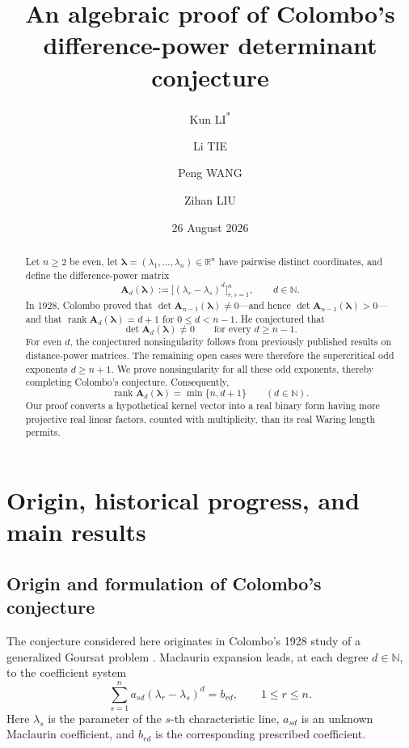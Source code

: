 \documentclass[11pt,letterpaper,reqno]{amsart}
\title[Colombo's difference-power determinant]{An algebraic proof of Colombo's difference-power determinant conjecture}
\author{Kun LI\textsuperscript{*}}
\author{Li TIE}
\author{Peng WANG}
\author{Zihan LIU}
\date{26 August 2026}
\numberwithin{equation}{section}
\theoremstyle{definition}
\newcommand{\RR}{\mathbb{R}}
\newcommand{\rank}{\operatorname{rank}}
\newcommand{\Mat}[1]{\mathbf{#1}}
\newcommand{\vct}[1]{\boldsymbol{#1}}
\begin{document}
\begin{abstract}
Let \(n\ge2\) be even, let
\(\vct{\lambda}=(\lambda_1,\ldots,\lambda_n)\in\RR^n\) have pairwise
distinct coordinates, and define the difference-power matrix
\[
 \Mat{A}_d(\vct{\lambda})
 :=
 \bigl[(\lambda_r-\lambda_s)^d\bigr]_{r,s=1}^n,
 \qquad d\in\mathbb N.
\]
In 1928, Colombo proved that
\(\det\Mat{A}_{n-1}(\vct{\lambda})\ne0\)---and hence
\(\det\Mat{A}_{n-1}(\vct{\lambda})>0\)---and that
\(\rank\Mat{A}_d(\vct{\lambda})=d+1\) for \(0\le d<n-1\).
He conjectured that
\[
 \det\Mat{A}_d(\vct{\lambda})\ne0
 \qquad\text{for every } d\ge n-1.
\]
For even \(d\), the conjectured nonsingularity follows from previously
published results on distance-power matrices.  The remaining open cases
were therefore the supercritical odd exponents \(d\ge n+1\).  We prove
nonsingularity for all these odd exponents, thereby completing Colombo's
conjecture.  Consequently,
\[
 \rank\Mat{A}_d(\vct{\lambda})=\min\{n,d+1\}
 \qquad(d\in\mathbb N).
\]
Our proof converts a hypothetical kernel vector into a real binary form
having more projective real linear factors, counted with multiplicity,
than its real Waring length permits.
\end{abstract}

\maketitle
\tableofcontents

\section{Origin, historical progress, and main results}
\label{sec:introduction}

\subsection{Origin and formulation of Colombo's conjecture}

The conjecture considered here originates in Colombo's 1928 study of a
generalized Goursat problem \cite[pp.~34--36]{Colombo1928}.  Maclaurin
expansion leads, at each degree \(d\in\mathbb N\), to the coefficient
system
\begin{equation}\label{eq:colombo-system}
 \sum_{s=1}^n a_{sd}(\lambda_r-\lambda_s)^d=b_{rd},
 \qquad 1\le r\le n.
\end{equation}
Here \(\lambda_s\) is the parameter of the \(s\)-th characteristic line,
\(a_{sd}\) is an unknown Maclaurin coefficient, and \(b_{rd}\) is the
corresponding prescribed coefficient.
\end{document}
